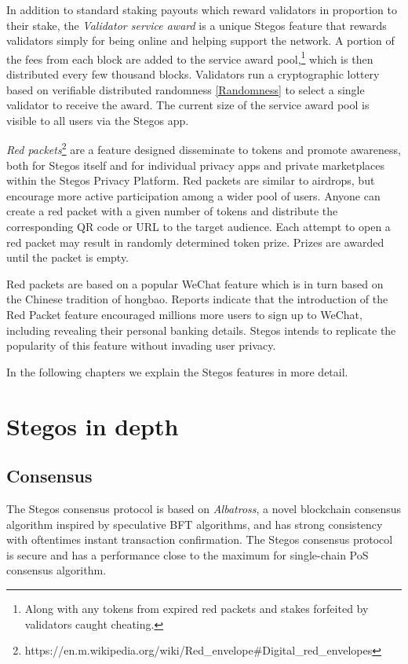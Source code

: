 \documentclass[8pt,fleqn,openany]{book}
\begin{document}
In addition to standard staking payouts which reward validators in proportion to their stake, the \textit{Validator service award} is a unique Stegos feature that rewards validators simply for being online and helping support the network. A portion of the fees from each block are added to the service award pool,\footnote{Along with any tokens from expired red packets and stakes forfeited by validators caught cheating.} which is then distributed every few thousand blocks. Validators run a cryptographic lottery based on verifiable distributed randomness \ref{Randomness} to select a single validator to receive the award. The current size of the service award pool is visible to all users via the Stegos app.

\textit{Red packets}\footnote{https://en.m.wikipedia.org/wiki/Red\_envelope\#Digital\_red\_envelopes} are a feature designed disseminate to tokens and promote awareness, both for Stegos itself and for individual privacy apps and private marketplaces within the Stegos Privacy Platform. Red packets are similar to airdrops, but encourage more active participation among a wider pool of users. Anyone can create a red packet with a given number of tokens and distribute the corresponding QR code or URL to the target audience. Each attempt to open a red packet may result in randomly determined token prize. Prizes are awarded until the packet is empty. 

Red packets are based on a popular WeChat feature which is in turn based on the Chinese tradition of hongbao. Reports indicate that the introduction of the Red Packet feature encouraged millions more users to sign up to WeChat, including revealing their personal banking details. Stegos intends to replicate the popularity of this feature without invading user privacy.
		
In the following chapters we explain the Stegos features in more detail.

\chapter{Stegos in depth}\label{chap:stegos-in-depth}

\section{Consensus}
The Stegos consensus protocol is based on \textit{Albatross}\cite{c23}, a novel blockchain consensus algorithm inspired by speculative BFT\cite{c9} algorithms, and has strong consistency with oftentimes instant transaction confirmation. The Stegos consensus protocol is secure and has a performance close to the maximum for single-chain PoS consensus algorithm.
\end{document}
